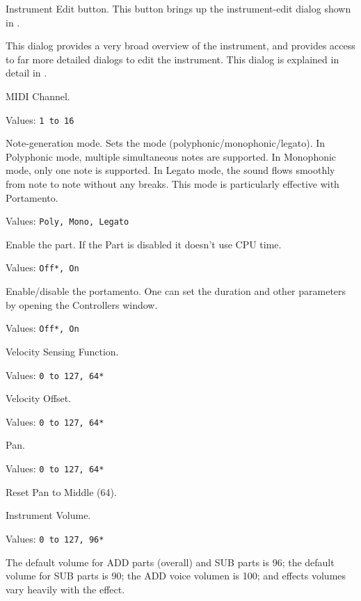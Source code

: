    Instrument Edit button.
   This button brings up the instrument-edit dialog shown in
   .

   This dialog provides a very broad overview of the instrument, and
   provides access to far more detailed dialogs to edit the instrument.
   This dialog is explained in detail in
   .

   MIDI Channel.

   Values: \texttt{1 to 16}

   Note-generation mode.
   Sets the mode (polyphonic/monophonic/legato).
   In Polyphonic mode, multiple simultaneous notes are supported.
   In Monophonic mode, only one note is supported.
   In Legato mode, the sound flows smoothly from note to note without
   any breaks.  This mode is particularly effective with Portamento.

   Values: \texttt{Poly, Mono, Legato}

   Enable the part. If the Part is disabled it doesn't use CPU time.

   Values: \texttt{Off*, On}

   Enable/disable the portamento.
   One can set the duration and other parameters by opening the Controllers
   window.

   Values: \texttt{Off*, On}

   Velocity Sensing Function.

   Values: \texttt{0 to 127, 64*}

   Velocity Offset.

   Values: \texttt{0 to 127, 64*}

   Pan.

   Values: \texttt{0 to 127, 64*}

   Reset Pan to Middle (64).

   Instrument Volume.

   Values: \texttt{0 to 127, 96*}
 
   The default volume for ADD parts (overall) and SUB parts is 96; the
   default volume for SUB parts is 90; the ADD voice volumen is 100; and
   effects volumes vary heavily with the effect.

